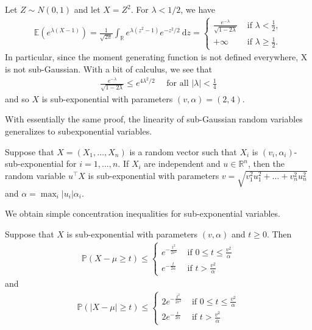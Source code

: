 \begin{eg}
    Let $Z \sim N(0,1)$ and let $X=Z^2$. For $\lambda<1 / 2$, we have
\begin{align*}
\mathbb{E}\left(e^{\lambda(X-1)}\right)=\frac{1}{\sqrt{2 \pi}} \int_{\mathbb{R}} e^{\lambda\left(z^2-1\right)} e^{-z^2 / 2} \mathrm{~d} z= \begin{cases}\frac{e^{-\lambda}}{\sqrt{1-2 \lambda}} & \text { if } \lambda<\frac{1}{2}, \\ +\infty & \text { if } \lambda \geq \frac{1}{2} .\end{cases}
\end{align*}
In particular, since the moment generating function is not defined everywhere, X is not sub-Gaussian. With a bit of calculus, we see that
\begin{align*}
\frac{e^{-\lambda}}{\sqrt{1-2 \lambda}} \leq e^{4 \lambda^2 / 2} \quad \text { for all }|\lambda|<\frac{1}{4}
\end{align*}
and so $X$ is sub-exponential with parameters $(v, \alpha)=(2,4)$.
\end{eg}




With essentially the same proof, the linearity of sub-Gaussian random variables generalizes to subexponential variables.

\begin{lem}
    Suppose that $X=\left(X_1, \ldots, X_n\right)$ is a random vector such that $X_i$ is $\left(v_i, \alpha_i\right)$-sub-exponential for $i=1, \ldots, n$. If $X_i$ are independent and $u \in \mathbb{R}^n$, then the random variable $u^{\top} X$ is sub-exponential with parameters $v=\sqrt{v_1^2 u_1^2+\ldots+v_n^2 u_n^2}$ and $\alpha=\max _i\left|u_i\right| \alpha_i$.
\end{lem}


We obtain simple concentration inequalities for sub-exponential variables.
\begin{prop}
    Suppose that $X$ is sub-exponential with parameters $(v, \alpha)$ and $t \geq 0$. Then
\begin{align*}
\mathbb{P}(X-\mu \geq t) \leq \begin{cases}e^{-\frac{t^2}{2 v^2}} & \text { if } 0 \leq t \leq \frac{v^2}{\alpha} \\ e^{-\frac{t}{2 \alpha}} & \text { if } t>\frac{v^2}{\alpha}\end{cases}
\end{align*}
and
\begin{align*}
\mathbb{P}(|X-\mu| \geq t) \leq \begin{cases}2 e^{-\frac{t^2}{2 v^2}} & \text { if } 0 \leq t \leq \frac{v^2}{\alpha} \\ 2 e^{-\frac{t}{2 \alpha}} & \text { if } t>\frac{v^2}{\alpha}\end{cases}
\end{align*}
\end{prop}

